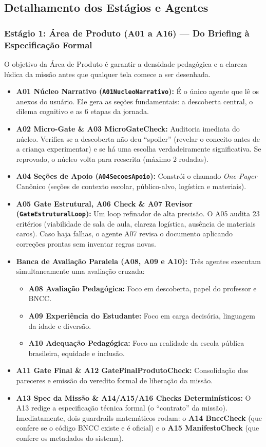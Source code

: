 \documentclass[11pt,a4paper]{article}
\begin{document}
\subsection{Detalhamento dos Estágios e Agentes}

\subsubsection{Estágio 1: Área de Produto (A01 a A16) --- Do Briefing à Especificação Formal}
O objetivo da Área de Produto é garantir a densidade pedagógica e a clareza lúdica da missão antes que qualquer tela comece a ser desenhada.
\begin{itemize}
  \item \textbf{A01 Núcleo Narrativo (\texttt{A01NucleoNarrativo}):} É o único agente que lê os anexos do usuário. Ele gera as seções fundamentais: a descoberta central, o dilema cognitivo e as 6 etapas da jornada.
  \item \textbf{A02 Micro-Gate \& A03 MicroGateCheck:} Auditoria imediata do núcleo. Verifica se a descoberta não deu ``spoiler'' (revelar o conceito antes de a criança experimentar) e se há uma escolha verdadeiramente significativa. Se reprovado, o núcleo volta para reescrita (máximo 2 rodadas).
  \item \textbf{A04 Seções de Apoio (\texttt{A04SecoesApoio}):} Constrói o chamado \textit{One-Pager} Canônico (seções de contexto escolar, público-alvo, logística e materiais).
  \item \textbf{A05 Gate Estrutural, A06 Check \& A07 Revisor (\texttt{GateEstruturalLoop}):} Um loop refinador de alta precisão. O A05 audita 23 critérios (viabilidade de sala de aula, clareza logística, ausência de materiais caros). Caso haja falhas, o agente A07 revisa o documento aplicando correções prontas sem inventar regras novas.
  \item \textbf{Banca de Avaliação Paralela (A08, A09 e A10):} Três agentes executam simultaneamente uma avaliação cruzada:
    \begin{itemize}[noitemsep]
      \item \textbf{A08 Avaliação Pedagógica:} Foco em descoberta, papel do professor e BNCC.
      \item \textbf{A09 Experiência do Estudante:} Foco em carga decisória, linguagem da idade e diversão.
      \item \textbf{A10 Adequação Pedagógica:} Foco na realidade da escola pública brasileira, equidade e inclusão.
    \end{itemize}
  \item \textbf{A11 Gate Final \& A12 GateFinalProdutoCheck:} Consolidação dos pareceres e emissão do veredito formal de liberação da missão.
  \item \textbf{A13 Spec da Missão \& A14/A15/A16 Checks Determinísticos:} O A13 redige a especificação técnica formal (o ``contrato'' da missão). Imediatamente, dois guardrails matemáticos rodam: o \textbf{A14 BnccCheck} (que confere se o código BNCC existe e é oficial) e o \textbf{A15 ManifestoCheck} (que confere os metadados do sistema).
\end{itemize}
\end{document}
